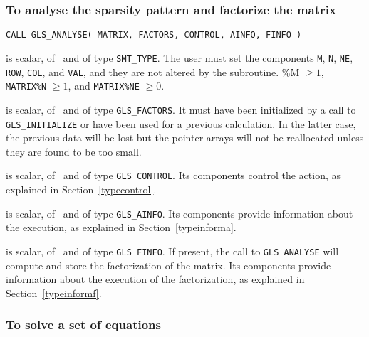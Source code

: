 \documentclass{galahad}
\newcommand{\packagename}{GLS}
\begin{document}

\subsubsection{To analyse the sparsity pattern and factorize the matrix}

\hspace{8mm}
{\tt CALL \packagename\_ANALYSE( MATRIX, FACTORS, CONTROL, AINFO, FINFO )}

\begin{description}

 is scalar, of \intentin\ and of type
{\tt SMT\_TYPE}.  The user must set the components {\tt M}, {\tt N}, 
{\tt NE}, {\tt ROW},
{\tt COL}, and {\tt VAL}, and they are not altered by the subroutine.
\%M $\geq 1$,
{\tt MATRIX\%N} $\geq 1$, and {\tt MATRIX\%NE} $\geq 0$.

 is scalar, of \intentinout\ and of type
{\tt \packagename\_FACTORS}. It must have been initialized by a call to
\linebreak
{\tt \packagename\_INITIALIZE} or have been used for a previous calculation.
In the latter case, the previous data will be lost but the pointer
arrays will not be reallocated unless they are found to be too small.

 is scalar, of \intentin\ and of type
{\tt \packagename\_CONTROL}. Its components control the action, as explained in
Section~\ref{typecontrol}.

 is scalar, of \intentout\ and of type {\tt \packagename\_AINFO}. Its
components provide information about the execution, as explained in
Section~\ref{typeinforma}.

 is scalar, of \intentout\ and of type 
{\tt \packagename\_FINFO}. 
If present, the call to {\tt \packagename\_ANALYSE} will 
compute and store the
factorization of the matrix.  Its
components provide information about the execution of the
factorization, as explained in
Section~\ref{typeinformf}.

\end{description}


\subsubsection{To solve a set of equations}
\end{document}
